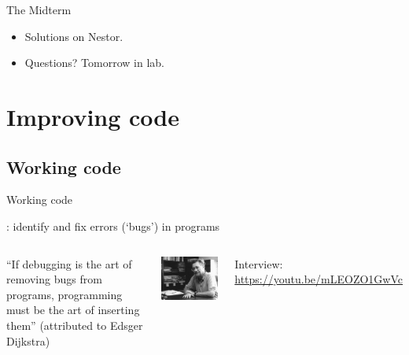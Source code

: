\documentclass[aspectratio=169,usenames,dvipsnames]{beamer}
\begin{document}
\begin{frame}{The Midterm}
    \begin{itemize}
        \item Solutions on Nestor.
        \item Questions? Tomorrow in lab.
    \end{itemize}
\end{frame}

\section{Improving code}
\subsection{Working code}
\frame{\tableofcontents[currentsection]}
\begin{frame}{Working code}
    \begin{definition}
        : identify and fix errors (`bugs') in programs
    \end{definition}

    \pause\vspace{1em}
    \begin{columns}
            ``If debugging is the art of removing bugs from programs,
            programming must be the art of inserting them''
            (attributed to Edsger Dijkstra)

            \includegraphics[height=0.5\textheight]{fig/dijkstra}

            \vspace{1em}
            Interview: \url{https://youtu.be/mLEOZO1GwVc}
    \end{columns}
\end{frame}
\end{document}
